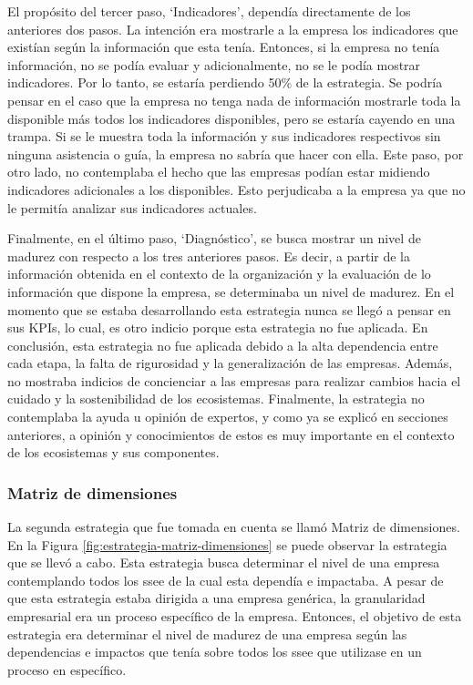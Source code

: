El propósito del tercer paso, ‘Indicadores’, dependía directamente de los anteriores dos pasos. La intención era mostrarle a la empresa los indicadores que existían según la información que esta tenía. Entonces, si la empresa no tenía información, no se podía evaluar y adicionalmente, no se le podía mostrar indicadores. Por lo tanto, se estaría perdiendo 50\% de la estrategia. Se podría pensar en el caso que la empresa no tenga nada de información mostrarle toda la disponible más todos los indicadores disponibles, pero se estaría cayendo en una trampa. Si se le muestra toda la información y sus indicadores respectivos sin ninguna asistencia o guía, la empresa no sabría que hacer con ella. Este paso, por otro lado, no contemplaba el hecho que las empresas podían estar midiendo indicadores adicionales a los disponibles. Esto perjudicaba a la empresa ya que no le permitía analizar sus indicadores actuales. 

Finalmente, en el último paso, ‘Diagnóstico’, se busca mostrar un nivel de madurez con respecto a los tres anteriores pasos. Es decir, a partir de la información obtenida en el contexto de la organización y la evaluación de lo información que dispone la empresa, se determinaba un nivel de madurez. En el momento que se estaba desarrollando esta estrategia nunca se llegó a pensar en sus KPIs, lo cual, es otro indicio porque esta estrategia no fue aplicada. En conclusión, esta estrategia no fue aplicada debido a la alta dependencia entre cada etapa, la falta de rigurosidad y la generalización de las empresas. Además, no mostraba indicios de concienciar a las empresas para realizar cambios hacia el cuidado y la sostenibilidad de los ecosistemas. Finalmente, la estrategia no contemplaba la ayuda u opinión de expertos, y como ya se explicó en secciones anteriores, a opinión y conocimientos de estos es muy importante en el contexto de los ecosistemas y sus componentes. 

\subsubsection{Matriz de dimensiones} \label{subsubsec:matriz-dimensiones}
La segunda estrategia que fue tomada en cuenta se llamó Matriz de dimensiones. En la Figura \ref{fig:estrategia-matriz-dimensiones} se puede observar la estrategia que se llevó a cabo. Esta estrategia busca determinar el nivel de una empresa contemplando todos los \acrshort{ssee} de la cual esta dependía e impactaba. A pesar de que esta estrategia estaba dirigida a una empresa genérica, la granularidad empresarial era un proceso específico de la empresa. Entonces, el objetivo de esta estrategia era determinar el nivel de madurez de una empresa según las dependencias e impactos que tenía sobre todos los \acrshort{ssee} que utilizase en un proceso en específico.

